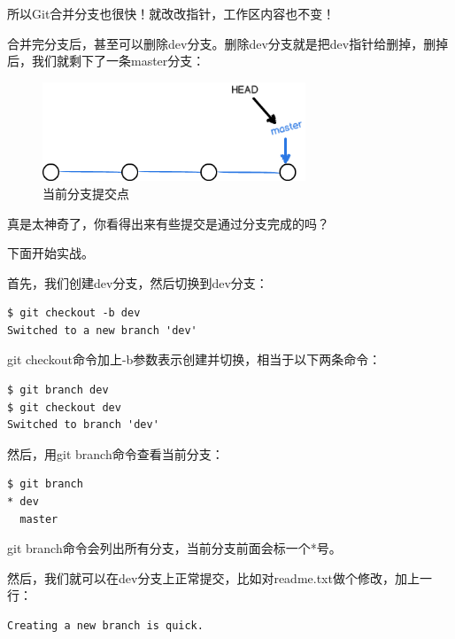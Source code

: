 所以Git合并分支也很快！就改改指针，工作区内容也不变！

合并完分支后，甚至可以删除dev分支。删除dev分支就是把dev指针给删掉，删掉后，我们就剩下了一条master分支：


\begin{figure}[h]
  \centering
  \includegraphics[width=0.7\textwidth]{img/git-br-rm.png}
  \caption{当前分支提交点}
  \label{fig:git-br-rm}
\end{figure}


真是太神奇了，你看得出来有些提交是通过分支完成的吗？

下面开始实战。

首先，我们创建dev分支，然后切换到dev分支：

\begin{verbatim}
$ git checkout -b dev
Switched to a new branch 'dev'
\end{verbatim}

git checkout命令加上-b参数表示创建并切换，相当于以下两条命令：

\begin{verbatim}
$ git branch dev
$ git checkout dev
Switched to branch 'dev'
\end{verbatim}

然后，用git branch命令查看当前分支：

\begin{verbatim}
$ git branch
* dev
  master
\end{verbatim}

git branch命令会列出所有分支，当前分支前面会标一个*号。

然后，我们就可以在dev分支上正常提交，比如对readme.txt做个修改，加上一行：

\begin{verbatim}
Creating a new branch is quick.
\end{verbatim}

